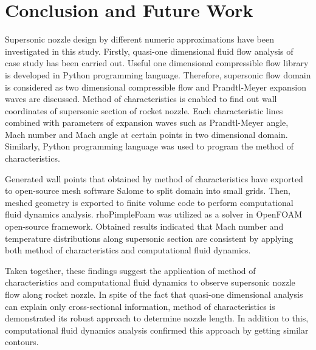 \cleardoublepage
{}
\section{Conclusion and Future Work}

Supersonic nozzle design by different numeric approximations have been investigated in this study. Firstly, quasi-one dimensional fluid flow analysis of case study has been carried out. Useful one dimensional compressible flow library is developed in Python programming language. Therefore, supersonic flow domain is considered as two dimensional compressible flow and Prandtl-Meyer expansion waves are discussed. Method of characteristics is enabled to find out wall coordinates of supersonic section of rocket nozzle. Each characteristic lines combined with parameters of expansion waves such as Prandtl-Meyer angle, Mach number and Mach angle at certain points in two dimensional domain. Similarly, Python programming language was used to program the method of characteristics.

Generated wall points that obtained by method of characteristics have exported to open-source mesh software Salome to split domain into small grids. Then, meshed geometry is exported to finite volume code to perform computational fluid dynamics analysis. rhoPimpleFoam was utilized as a solver in OpenFOAM open-source framework.
Obtained results indicated that Mach number and temperature distributions along supersonic section are consistent by applying both method of characteristics and computational fluid dynamics.

Taken together, these findings suggest the application of method of characteristics and computational fluid dynamics to  observe supersonic nozzle flow along rocket nozzle. In spite of the fact that quasi-one dimensional analysis can explain only cross-sectional information, method of characteristics is demonstrated its robust approach to determine nozzle length. In addition to this, computational fluid dynamics analysis confirmed this approach by getting similar contours.

